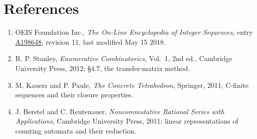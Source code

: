\documentclass[11pt]{article}
\theoremstyle{definition}
\begin{document}
\section{References}

\begin{enumerate}

\item OEIS Foundation Inc., \emph{The On-Line Encyclopedia of Integer Sequences}, entry \href{https://oeis.org/A198648}{A198648}, revision 11, last modified May 15 2018.

\item R. P. Stanley, \emph{Enumerative Combinatorics}, Vol.~1, 2nd ed., Cambridge University Press, 2012; \S4.7, the transfer-matrix method.

\item M. Kauers and P. Paule, \emph{The Concrete Tetrahedron}, Springer, 2011; C-finite sequences and their closure properties.

\item J. Berstel and C. Reutenauer, \emph{Noncommutative Rational Series with Applications}, Cambridge University Press, 2011; linear representations of counting automata and their reduction.

\end{enumerate}
\end{document}
